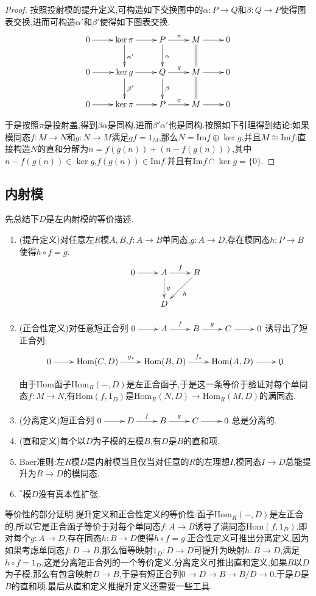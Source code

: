 \begin{enumerate}
\begin{proof}
    	按照投射模的提升定义,可构造如下交换图中的$\alpha:P\to Q$和$\beta:Q\to P$使得图表交换,进而可构造$\alpha'$和$\beta'$使得如下图表交换.
    	$$\xymatrix{0\ar[r]&\ker\pi\ar[r]\ar[d]^{\alpha'}&P\ar[r]^{\pi}\ar[d]^{\alpha}&M\ar[r]\ar@{=}[d]&0\\0\ar[r]&\ker g\ar[r]\ar[d]^{\beta'}&Q\ar[r]^{g}\ar[d]^{\beta}&M\ar[r]\ar@{=}[d]&0\\0\ar[r]&\ker\pi\ar[r]&P\ar[r]^{\pi}&M\ar[r]&0}$$
    	
    	于是按照$\pi$是投射盖,得到$\beta\alpha$是同构,进而$\beta'\alpha'$也是同构.按照如下引理得到结论:如果模同态$f:M\to N$和$g:N\to M$满足$gf=1_M$,那么$N=\mathrm{Im}f\oplus\ker g$,并且$M\cong\mathrm{Im}f$:直接构造$N$的直和分解为$n=f(g(n))+(n-f(g(n)))$,其中$n-f(g(n))\in\ker g$,$f(g(n))\in\mathrm{Im}f$.并且有$\mathrm{Im}f\cap\ker g=\{0\}$.
    \end{proof}
\end{enumerate}
\newpage
\subsection{内射模}

先总结下$D$是左内射模的等价描述.
\begin{enumerate}
	\item (提升定义)对任意左$R$模$A,B$,$f:A\to B$单同态,$g:A\to D$,存在模同态$h:P\to B$使得$h\circ f=g$.
	$$\xymatrix{0\ar[r]&A\ar[d]^{g}\ar[r]^{f}&B\ar[dl]^{h}\\&D}$$
	\item (正合性定义)对任意短正合列$\xymatrix{0\ar[r]&A\ar[r]^{f}&B\ar[r]^{g}&C\ar[r]&0}$诱导出了短正合列:
	$$\xymatrix{0\ar[r]&\mathrm{Hom}(C,D)\ar[r]^{g_*}&\mathrm{Hom}(B,D)\ar[r]^{f_*}&\mathrm{Hom}(A,D)\ar[r]&0}$$
	
	由于Hom函子$\mathrm{Hom}_R(-,D)$是左正合函子,于是这一条等价于验证对每个单同态$f:M\to N$,有$\mathrm{Hom}(f,1_D)$是$\mathrm{Hom}_R(N,D)\to\mathrm{Hom}_R(M,D)$的满同态.
	\item (分离定义)短正合列$\xymatrix{0\ar[r]&D\ar[r]^{f}&B\ar[r]^{g}&C\ar[r]&0}$总是分离的.
	\item (直和定义)每个以$D$为子模的左模$B$,有$D$是$B$的直和项.
	\item Baer准则:左$R$模$D$是内射模当且仅当对任意的$R$的左理想$I$,模同态$I\to D$总能提升为$R\to D$的模同态.
	\item $^*$模$D$没有真本性扩张.
\end{enumerate}

等价性的部分证明.提升定义和正合性定义的等价性:函子$\mathrm{Hom}_R(-,D)$是左正合的,所以它是正合函子等价于对每个单同态$f:A\to B$诱导了满同态$\mathrm{Hom}(f,1_D)$,即对每个$g:A\to D$,存在同态$h:B\to D$使得$h\circ f=g$.正合性定义可推出分离定义,因为如果考虑单同态$f:D\to B$,那么恒等映射$1_D:D\to D$可提升为映射$h:B\to D$,满足$h\circ f=1_D$,这是分离短正合列的一个等价定义.分离定义可推出直和定义,如果$B$以$D$为子模,那么有包含映射$D\to B$,于是有短正合列$0\to D\to B\to B/D\to0$.于是$D$是$B$的直和项.最后从直和定义推提升定义还需要一些工具.

